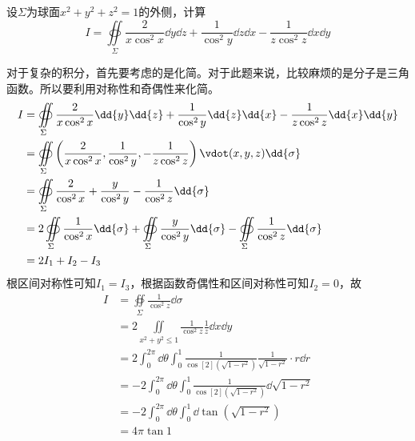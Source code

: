 \begin{example}
    设$\Sigma$为球面$x^2+y^2+z^2=1$的外侧，计算
    \[ I = \oiint\limits_\Sigma \frac{2}{x\cos^2 x}\dd{y}\dd{z} + \frac{1}{\cos^2 y}\dd{z}\dd{x} - \frac{1}{z\cos^2 z}\dd{x}\dd{y} \]
\end{example}
\begin{solution}
    对于复杂的积分，首先要考虑的是化简。对于此题来说，比较麻烦的是分子是三角函数。所以要利用对称性和奇偶性来化简。
    \begin{align*}
        I & = \oiint\limits_\Sigma \frac{2}{x\cos^2 x}\dd{y}\dd{z} + \frac{1}{\cos^2 y}\dd{z}\dd{x} - \frac{1}{z\cos^2 z}\dd{x}\dd{y}                                         \\
          & = \oiint\limits_\Sigma \left(\frac{2}{x\cos^2 x} , \frac{1}{\cos^2 y} , -\frac{1}{z\cos^2 z}\right)\vdot(x,y,z)\dd{\sigma}                                        \\
          & = \oiint\limits_\Sigma \frac{2}{\cos^2 x} + \frac{y}{\cos^2 y} - \frac{1}{\cos^2 z} \dd{\sigma}                                                                   \\
          & = 2\oiint\limits_\Sigma \frac{1}{\cos^2 x} \dd{\sigma} + \oiint\limits_\Sigma \frac{y}{\cos^2 y} \dd{\sigma} -\oiint\limits_\Sigma \frac{1}{\cos^2 z} \dd{\sigma} \\
          & = 2I_1 + I_2 - I_3
    \end{align*}
    根区间对称性可知$I_1 = I_3$，根据函数奇偶性和区间对称性可知$I_2=0$，故
    \begin{align*}
        I & = \oiint\limits_\Sigma \frac{1}{\cos^2 z} \dd{\sigma}                                                      \\
          & = 2\iint\limits_{x^2+y^2\leq 1} \frac{1}{\cos^2 z}\frac{1}{z}\dd{x}\dd{y}                                  \\
          & = 2\int_0^{2\pi} \dd{\theta} \int_0^1 \frac{1}{\cos[2](\sqrt{1-r^2})} \frac{1}{\sqrt{1-r^2}}\cdot r \dd{r} \\
          & = -2\int_0^{2\pi} \dd{\theta}\int_0^1 \frac{1}{\cos[2](\sqrt{1-r^2})} \dd{\sqrt{1-r^2}}                    \\
          & = -2\int_0^{2\pi} \dd{\theta}\int_0^1  \dd{\tan(\sqrt{1-r^2})}                                             \\
          & = 4\pi\tan 1
    \end{align*}
\end{solution}

